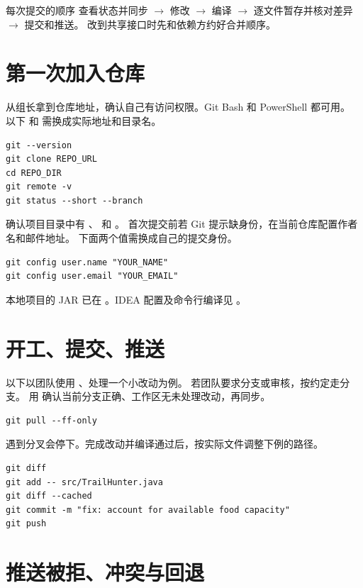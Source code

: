 \documentclass[UTF8,11pt,a4paper]{ctexart}
\begin{document}
\maketitle
\thispagestyle{fancy}

\begin{keybox}{每次提交的顺序}
查看状态并同步 $\longrightarrow$ 修改 $\longrightarrow$ 编译
$\longrightarrow$ 逐文件暂存并核对差异 $\longrightarrow$ 提交和推送。
改到共享接口时先和依赖方约好合并顺序。
\end{keybox}

\section{第一次加入仓库}

从组长拿到仓库地址，确认自己有访问权限。Git Bash 和 PowerShell 都可用。
以下  和  需换成实际地址和目录名。
\begin{lstlisting}
git --version
git clone REPO_URL
cd REPO_DIR
git remote -v
git status --short --branch
\end{lstlisting}
确认项目目录中有 、 和 。
首次提交前若 Git 提示缺身份，在当前仓库配置作者名和邮件地址。
下面两个值需换成自己的提交身份。
\begin{lstlisting}
git config user.name "YOUR_NAME"
git config user.email "YOUR_EMAIL"
\end{lstlisting}
本地项目的 JAR 已在 。IDEA 配置及命令行编译见
。

\section{开工、提交、推送}

以下以团队使用 、处理一个小改动为例。
若团队要求分支或审核，按约定走分支。
用  确认当前分支正确、工作区无未处理改动，再同步。
\begin{lstlisting}
git pull --ff-only
\end{lstlisting}
 遇到分叉会停下。完成改动并编译通过后，按实际文件调整下例的路径。
\begin{lstlisting}
git diff
git add -- src/TrailHunter.java
git diff --cached
git commit -m "fix: account for available food capacity"
git push
\end{lstlisting}

\clearpage
\section{推送被拒、冲突与回退}
\end{document}

